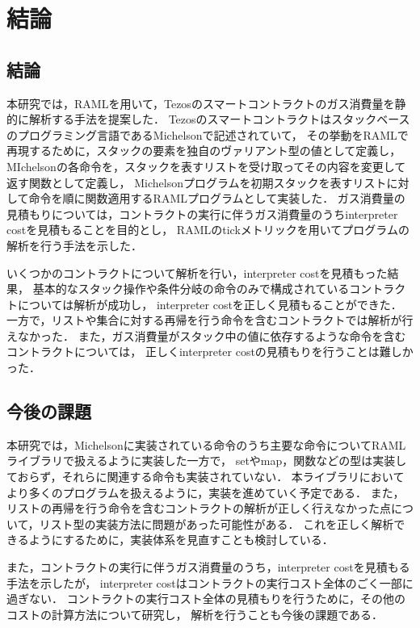 \documentclass{kuisthesis}
\begin{document}
\section{結論}\label{sec-conclusion}
\subsection{結論} \label{subsec-conclusion-conclusion}
本研究では，RAMLを用いて，Tezosのスマートコントラクトのガス消費量を静的に解析する手法を提案した．
Tezosのスマートコントラクトはスタックベースのプログラミング言語であるMichelsonで記述されていて，
その挙動をRAMLで再現するために，スタックの要素を独自のヴァリアント型の値として定義し，
MIchelsonの各命令を，スタックを表すリストを受け取ってその内容を変更して返す関数として定義し，
Michelsonプログラムを初期スタックを表すリストに対して命令を順に関数適用するRAMLプログラムとして実装した．
ガス消費量の見積もりについては，コントラクトの実行に伴うガス消費量のうちinterpreter costを見積もることを目的とし，
RAMLのtickメトリックを用いてプログラムの解析を行う手法を示した．

いくつかのコントラクトについて解析を行い，interpreter costを見積もった結果，
基本的なスタック操作や条件分岐の命令のみで構成されているコントラクトについては解析が成功し，
interpreter costを正しく見積もることができた．
一方で，リストや集合に対する再帰を行う命令を含むコントラクトでは解析が行えなかった．
また，ガス消費量がスタック中の値に依存するような命令を含むコントラクトについては，
正しくinterpreter costの見積もりを行うことは難しかった．

\subsection{今後の課題} \label{subsec-conclusion-work}
本研究では，Michelsonに実装されている命令のうち主要な命令についてRAMLライブラリで扱えるように実装した一方で，
setやmap，関数などの型は実装しておらず，それらに関連する命令も実装されていない．
本ライブラリにおいてより多くのプログラムを扱えるように，実装を進めていく予定である．
また，リストの再帰を行う命令を含むコントラクトの解析が正しく行えなかった点について，リスト型の実装方法に問題があった可能性がある．
これを正しく解析できるようにするために，実装体系を見直すことも検討している．

また，コントラクトの実行に伴うガス消費量のうち，interpreter costを見積もる手法を示したが，
interpreter costはコントラクトの実行コスト全体のごく一部に過ぎない．
コントラクトの実行コスト全体の見積もりを行うために，その他のコストの計算方法について研究し，
解析を行うことも今後の課題である．
\end{document}
